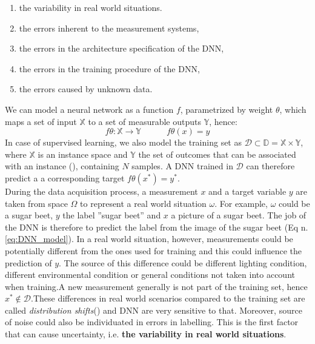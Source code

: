 \begin{enumerate}[label=\Roman*.]
    \item the variability in real world situations. 
    \item the errors inherent to the measurement systems,
    \item the errors in the architecture specification of the DNN,
    \item the errors in the training procedure of the DNN,
    \item the errors caused by unknown data.
\end{enumerate}
We can model a neural network as a function $f$, parametrized by weight $\theta$, which maps a set of input $\mathbb{X}$ to a set of measurable outputs $\mathbb{Y}$, hence:
\begin{equation}
    f\theta : \mathbb{X} \rightarrow \mathbb{Y} \quad\quad\quad
    f\theta(x) = y
    \label{eq:DNN_model}
\end{equation}
In case of supervised learning, we also model the training set as $\mathcal{D} \subset \mathbb{D} = \mathbb{X} \times \mathbb{Y}$, where $\mathbb{X}$ is an instance space and $\mathbb{Y}$ the set of outcomes that can be associated with an instance (\cite{uncertainity_classi}), containing $N$ samples. A DNN trained in $\mathcal{D}$ can therefore predict a a corresponding target $f\theta(x^*) = y^*$.\\
During the data acquisition process, a measurement $x$ and a target variable $y$ are taken from space $\Omega$ to  represent a real world situation $\omega$. For example, $\omega$ could be a sugar beet, $y$ the label ''sugar beet'' and $x$ a picture of a sugar beet. The job of the DNN is therefore to predict the label from the image of the sugar beet (Eq n. \ref{eq:DNN_model}). In a real world situation, however, measurements could be potentially different from the ones used for training and this could influence the prediction of $y$. The source of this difference could be different lighting condition, different environmental condition or general conditions not taken into account when training.A new measurement generally is not part of the training set, hence $x^* \notin \mathcal{D}$.These differences in real world scenarios compared to the training set are called \textit{distribution shifts}(\cite{ovadia2019trust}) and DNN are very sensitive to that. Moreover, source of noise could also be individuated in errors in labelling. This is the first factor that can cause uncertainty, i.e. \textbf{the variability in real world situations}. \cite{gawlikowski2021survey}\\
